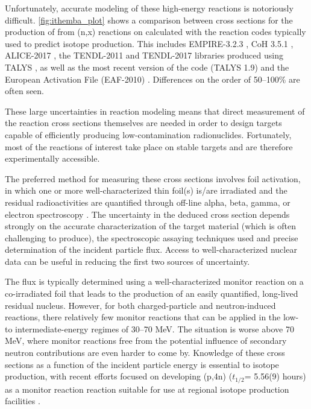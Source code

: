 \documentclass[letterpaper]{ar-1col}
\begin{document}
Unfortunately, accurate modeling of these high-energy reactions is notoriously difficult.  \autoref{fig:ithemba_plot} shows a comparison between cross sections for the production of  from (n,x) reactions on  calculated with the reaction codes typically used to predict isotope production.  This includes EMPIRE-3.2.3 \cite{Herman2013}, CoH 3.5.1 \cite{KAWANO2010}, ALICE-2017 \cite{Blann1996}, the TENDL-2011 and TENDL-2017 libraries produced using TALYS \cite{Rochman2017}, as well as the most recent version of the code (TALYS 1.9) \cite{Koning2012} and the European Activation File (EAF-2010) \cite{Forrest2005}.  Differences on the order of 50--100\% are often seen.  

These large uncertainties in reaction modeling means that direct measurement of the reaction cross sections themselves are needed in order to design targets capable of efficiently producing low-contamination radionuclides.  Fortunately, most of the reactions of interest take place on stable targets and are therefore experimentally accessible. 

The preferred method for measuring these cross sections involves foil activation, in which one or more well-characterized thin foil(s) is/are irradiated and the residual radioactivities are quantified through off-line alpha, beta, gamma, or electron spectroscopy \cite{Voyles2018a,Graves2016}.  The uncertainty in the deduced cross section depends strongly on the accurate characterization of the target material (which is often challenging to produce), the spectroscopic assaying techniques used and precise determination of the incident particle flux. Access to well-characterized nuclear data can be useful in reducing the first two sources of uncertainty. 


The flux is typically determined using a well-characterized monitor reaction on a co-irradiated foil that leads to the production of an easily quantified, long-lived residual nucleus. However, for both charged-particle and neutron-induced reactions, there relatively few monitor reactions that can be applied in the low- to intermediate-energy regimes of 30--70 MeV.  The situation is worse above 70 MeV, where monitor reactions  free from the potential influence of secondary neutron contributions are even harder to come by.  Knowledge of these cross sections as a function of the incident particle energy is essential to  isotope production, with recent efforts focused on developing  (p,4n) ($t_{1/2}$= 5.56(9) hours) as a monitor reaction reaction suitable for use at regional isotope production facilities \cite{Voyles2018a, Kim2018}.  
\end{document}
